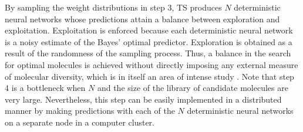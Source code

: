 By sampling the weight distributions in step 3, TS produces $N$ deterministic neural networks whose predictions attain a balance between exploration and exploitation. Exploitation is enforced because each deterministic neural network is a noisy estimate of the Bayes' optimal predictor. Exploration is obtained as a result of the randomness of the sampling process. 
Thus, a balance in the search for optimal molecules is achieved without directly imposing any external measure of molecular diversity, which is in itself an area of intense study \cite{Maldonado_2006}. 
Note that step 4 is a bottleneck when $N$ and the size of the library of candidate molecules are very large.
Nevertheless, this step can be easily implemented in a distributed manner by making predictions with each of
the $N$ deterministic neural networks on a separate node in a computer cluster.